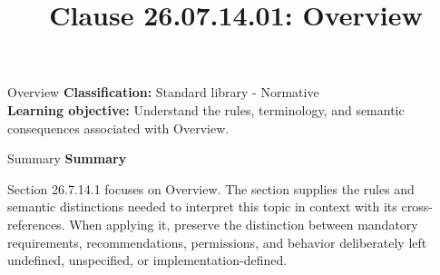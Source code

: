 \documentclass[10pt,letterpaper]{article}
\title{Clause 26.07.14.01: Overview}
\author{}
\date{}
\begin{document}
\maketitle
\begin{CornellOverviewBox}{Overview}
\textbf{Classification:} Standard library - Normative\\[2pt]
\textbf{Learning objective:} Understand the rules, terminology, and semantic consequences associated with Overview.
\end{CornellOverviewBox}\begin{CornellSummaryBox}{Summary}
{\sffamily\bfseries\color{Accent} Summary}\par\vspace{3pt}Section 26.7.14.1 focuses on Overview. The section supplies the rules and semantic distinctions needed to interpret this topic in context with its cross-references. When applying it, preserve the distinction between mandatory requirements, recommendations, permissions, and behavior deliberately left undefined, unspecified, or implementation-defined.
\end{CornellSummaryBox}
\end{document}
